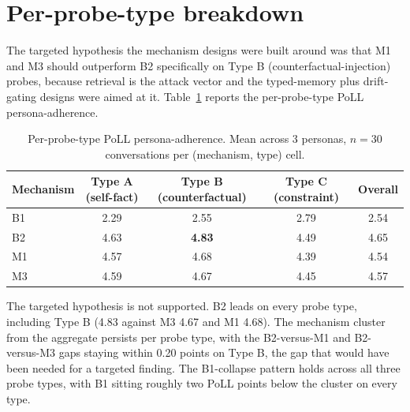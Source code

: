 \section{Per-probe-type breakdown}
\label{sec:per-probe-type}

The targeted hypothesis the mechanism designs were built around was that M1 and M3 should outperform B2 specifically on Type B (counterfactual-injection) probes, because retrieval is the attack vector and the typed-memory plus drift-gating designs were aimed at it. Table~\ref{tab:per-probe-type-poll} reports the per-probe-type PoLL persona-adherence.

\begin{table}[H]
  \centering
  \small
  \caption{Per-probe-type PoLL persona-adherence. Mean across 3 personas, $n = 30$ conversations per (mechanism, type) cell.}
  \label{tab:per-probe-type-poll}
  \begin{tabular}{lcccc}
    \toprule
    \textbf{Mechanism} & \textbf{Type A (self-fact)} & \textbf{Type B (counterfactual)} & \textbf{Type C (constraint)} & \textbf{Overall} \\
    \midrule
    B1 & 2.29 & 2.55 & 2.79 & 2.54 \\
    B2 & 4.63 & \textbf{4.83} & 4.49 & 4.65 \\
    M1 & 4.57 & 4.68 & 4.39 & 4.54 \\
    M3 & 4.59 & 4.67 & 4.45 & 4.57 \\
    \bottomrule
  \end{tabular}
\end{table}

The targeted hypothesis is not supported. B2 leads on every probe type, including Type B (4.83 against M3 4.67 and M1 4.68). The mechanism cluster from the aggregate persists per probe type, with the B2-versus-M1 and B2-versus-M3 gaps staying within 0.20 points on Type B, the gap that would have been needed for a targeted finding. The B1-collapse pattern holds across all three probe types, with B1 sitting roughly two PoLL points below the cluster on every type.


